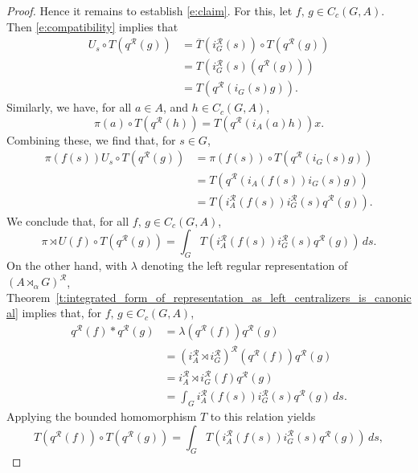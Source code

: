 \documentclass{amsart}
\theoremstyle{plain}
\theoremstyle{definition}
\numberwithin{equation}{section}
\begin{document}
\begin{proof}
Hence it remains to establish \eqref{e:claim}. For this, let $f,\,g\in C_c(G,A)$. Then \eqref{e:compatibility} implies that
\begin{align*}
U_s \circ T({q^{\mathcal R}}(g)) &= \overline T(i_G^{\mathcal R}(s)) \circ T({q^{\mathcal R}}(g)) \\
&= T(i_G^{\mathcal R}(s)(q^{\mathcal R}(g))) \\
&= T\left({q^{\mathcal R}}(i_G(s)g)\right).
\end{align*}
Similarly, we have, for all $a \in A$, and $h\in C_c(G,A)$,
\[ \pi(a) \circ T({q^{\mathcal R}}(h)) = T \left({q^{\mathcal R}}(i_A(a)h)\right)x. \]
Combining these, we find that, for $s \in G$,
\begin{align*}
\pi(f(s)) U_s \circ T({q^{\mathcal R}}(g)) &= \pi(f(s)) \circ T\left({q^{\mathcal R}}(i_G(s)g)\right) \\
&= T \left( {q^{\mathcal R}}(i_A(f(s)) i_G(s)g) \right) \\
&= T \left(i_A^{\mathcal R}(f(s)) i_G^{\mathcal R}(s) {q^{\mathcal R}}(g) \right).
\end{align*}
We conclude that, for all $f,\,g\in C_c(G,A)$,
\begin{equation}\label{e:first_expression}
{\pi \rtimes U}(f) \circ T({q^{\mathcal R}}(g)) = \int_G T \left( i_A^{\mathcal R}(f(s)) i_G^{\mathcal R}(s){q^{\mathcal R}}(g) \right) \,ds.
\end{equation}
On the other hand, with $\lambda$ denoting the left regular representation of ${(A {\rtimes}_\alpha G)^\mathcal{R}}$, Theorem~\ref{t:integrated_form_of_representation_as_left_centralizers_is_canonical} implies that, for $f,\,g\in C_c(G,A)$,
\begin{align*}
{q^{\mathcal R}}(f) * {q^{\mathcal R}}(g)&=\lambda({q^{\mathcal R}}(f)) {q^{\mathcal R}}(g) \\
&= (i_A^{\mathcal R} {\rtimes} i_G^{\mathcal R})^{\mathcal R}({q^{\mathcal R}}(f)) {q^{\mathcal R}}(g) \\
&= i_A^{\mathcal R} {\rtimes} i_G^{\mathcal R}(f) {q^{\mathcal R}}(g) \\
&=\int_G i_A^{\mathcal R}(f(s))i_G^{\mathcal R}(s) {q^{\mathcal R}}(g) \,ds.
\end{align*}
Applying the bounded homomorphism $T$ to this relation yields
\begin{equation}\label{e:second_expression}
T({q^{\mathcal R}}(f))\circ T({q^{\mathcal R}}(g))= \int_G T\left(i_A^{\mathcal R}(f(s))i_G^{\mathcal R}(s){q^{\mathcal R}}(g)\right)\,ds,
\end{equation}

\end{proof}
\end{document}
